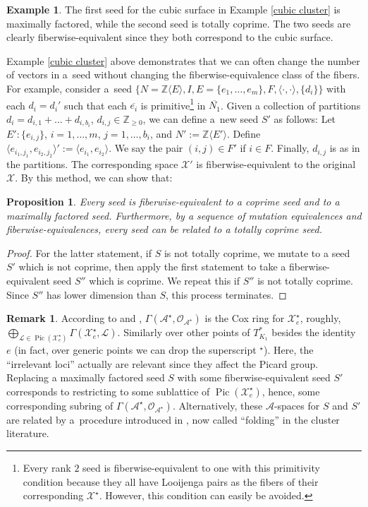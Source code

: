 \documentclass[11pt]{article}
\numberwithin{equation}{section}
\numberwithin{figure}{section}
\numberwithin{table}{section}
\DeclareMathOperator{\Pic}{Pic}
\let\?=\overline
\let\bb=\mathbb
\let\s=\mathcal
\newtheorem{prop}[thm]{Proposition}
\theoremstyle{definition}
\newtheorem{eg}[thm]{Example}
\newtheorem{rmk}[thm]{Remark}
\begin{document}
\begin{eg}The first seed for the cubic surface in Example \ref{cubic cluster} is maximally factored, while the second seed is totally coprime. The two seeds are clearly fiberwise-equivalent since they both correspond to the cubic surface.
\end{eg}

 Example \ref{cubic cluster} above demonstrates that we can often change the number of vectors in a~seed without changing the fiberwise-equivalence class of the fibers. For example, consider a~seed $\{N=\bb{Z}\langle E \rangle, I,E=\{e_1,\dots,e_m\},F, \langle \cdot, \cdot \rangle, \{d_i\}\}$ with each $d_i=d_i'$ such that each $\?{e_i}$ is primitive\footnote{Every rank $2$ seed is fiberwise-equivalent to one with this primitivity condition because they all have Looijenga pairs as the fibers of their corresponding $\s{X}^{\star}$. However, this condition can easily be avoided.} in $\?{N_1}$. Given a collection of partitions $d_i=d_{i,1}+\dots+d_{i,b_i}$, $d_{i,j}\in \bb{Z}_{\geq 0}$, we can define a~new seed $S'$ as follows: Let $E'\colon \{e_{i,j}\}$, $i=1,\dots,m$, $j=1,\dots,b_i$, and $N':=\bb{Z}\langle E' \rangle$. Define $\langle e_{i_1,j_1},e_{i_2,j_2}\rangle':=\langle e_{i_1},e_{i_2}\rangle$. We say the pair $(i,j)\in F'$ if $i\in F$. Finally, $d_{i,j}$ is as in the partitions. The corresponding space $\s{X}'$ is fiberwise-equivalent to the original $\s{X}$. By this method, we can show that:
\begin{prop}\label{CoprimeEquiv}
Every seed is fiberwise-equivalent to a coprime seed and to a maximally factored seed. Furthermore, by a sequence of mutation equivalences and fiberwise-equivalences, every seed can be related to a totally coprime seed.
\end{prop}
\begin{proof}For the latter statement, if $S$ is not totally coprime, we mutate to a seed $S'$ which is not coprime, then apply the first statement to take a fiberwise-equivalent seed $S''$ which is coprime. We repeat this if $S''$ is not totally coprime. Since $S''$ has lower dimension than $S$, this process terminates.
\end{proof}

\begin{rmk}\label{Cox}According to \cite[Section~4]{GHK3} and \cite{ManCox}, $\Gamma(\s{A}^{\star},\s{O}_{\s{A}^{\star}})$ is the Cox ring for $\s{X}^{\star}_e$, roughly, $\bigoplus_{\s{L}\in \Pic(\s{X}_e^{\star})} \Gamma(\s{X}_e^{\star},\s{L})$. Similarly over other points of $T_{K_1}^*$ besides the identity $e$ (in fact, over generic points we can drop the superscript $\left.^\star\right.$). Here, the ``irrelevant loci'' actually are relevant since they affect the Picard group. Replacing a maximally factored seed $S$ with some fiberwise-equivalent seed $S'$ corresponds to restricting to some sublattice of $\Pic(\s{X}_e^{\star})$, hence, some corresponding subring of $\Gamma(\s{A}^{\star},\s{O}_{\s{A}^{\star}})$. Alternatively, these $\s{A}$-spaces for $S$ and $S'$ are related by a~procedure introduced in \cite{Dup}, now called ``folding'' in the cluster literature.
\end{rmk}
\end{document}
